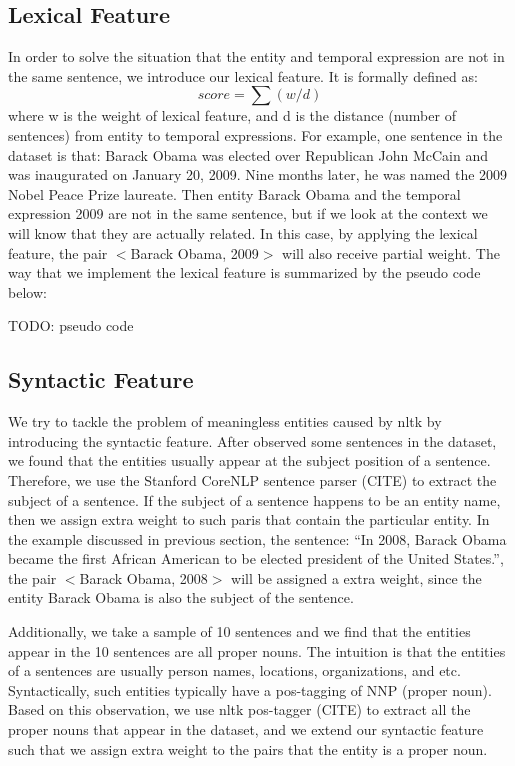 \documentclass[12pt,a4paper]{article}
\begin{document}
\subsection{Lexical Feature}
In order to solve the situation that the entity and temporal expression are not in the same sentence, we introduce our lexical feature. It is formally defined as: \newline
\[score = \sum (w / d )\]
 \newline
where w is the weight of lexical feature, and d is the distance (number of sentences) from entity to temporal expressions. For example, one sentence in the dataset is that: Barack Obama was elected over Republican John McCain and was inaugurated on January 20, 2009. Nine months later, he was named the 2009 Nobel Peace Prize laureate. Then entity Barack Obama and the temporal expression 2009 are not in the same sentence, but if we look at the context we will know that they are actually related. In this case, by applying the lexical feature, the pair $<$Barack Obama, 2009$>$ will also receive partial weight. The way that we implement the lexical feature is summarized by the pseudo code below:

TODO: pseudo code

\subsection{Syntactic Feature}
We try to tackle the problem of meaningless entities caused by nltk by introducing the syntactic feature. After observed some sentences in the dataset, we found that the entities usually appear at the subject position of a sentence. Therefore, we use the Stanford CoreNLP sentence parser (CITE) to extract the subject of a sentence. If the subject of a sentence happens to be an entity name, then we assign extra weight to such paris that contain the particular entity. In the example discussed in previous section, the sentence: “In 2008, Barack Obama became the first African American to be elected president of the United States.”, the pair $<$Barack Obama, 2008$>$ will be assigned a extra weight, since the entity Barack Obama is also the subject of the sentence. 

Additionally, we take a sample of 10 sentences and we find that the entities appear in the 10 sentences are all proper nouns. The intuition is that the entities of a sentences are usually person names, locations, organizations, and etc. Syntactically, such entities typically have a pos-tagging of NNP (proper noun). Based on this observation, we use nltk pos-tagger (CITE) to extract all the proper nouns that appear in the dataset, and we extend our syntactic feature such that we assign extra weight to the pairs that the entity is a proper noun. 
\end{document}
